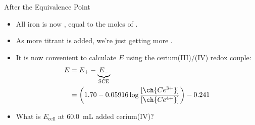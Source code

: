 \documentclass[notes=only]{beamer}
\begin{document}
\begin{frame}{After the Equivalence Point}
	\begin{itemize}
		\item All iron is now , equal to the moles of
			.
		\item As more titrant is added, we're just getting more
			.
		\item It is now convenient to calculate $E$ using the
			cerium(III)/(IV) redox couple:
			\begin{align*}
				E &= E_+ -
				\underbrace{E_-}_{\mathclap{\text{SCE}}} \\
				&= \left( 1.70 - 0.05916 \log
				\frac{[\ch{Ce^{3+}}]}{[\ch{Ce^{4+}}]} \right) -
				0.241
			\end{align*}
		\item What is $E_\text{cell}$ at \SI{60.0}{\milli\liter} added
			cerium(IV)?
	\end{itemize}


\end{frame}
\end{document}
